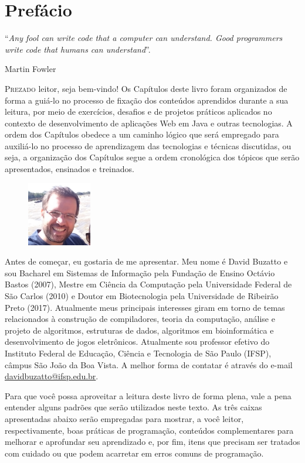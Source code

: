 \chapter{Prefácio}
\epigraph{``\textit{Any fool can write code that a computer can understand. Good programmers write code that humans can understand}''.}{Martin Fowler}

\lettrine[lines=4, lhang=0.1, lraise=0, loversize=0.2, findent=0.1em]{\textcolor{corAzulTema}{P}}{rezado} leitor, seja bem-vindo! Os Capítulos deste livro foram organizados de forma a guiá-lo no processo de fixação dos conteúdos aprendidos durante a sua leitura, por meio de exercícios, desafios e de projetos práticos aplicados no contexto de desenvolvimento de aplicações Web em Java e outras tecnologias. A ordem dos Capítulos obedece a um caminho lógico que será empregado para auxiliá-lo no processo de aprendizagem das tecnologias e técnicas discutidas, ou seja, a organização dos Capítulos segue a ordem cronológica dos tópicos que serão apresentados, ensinados e treinados.

\begin{figure}
    \centering
    \includegraphics[width=0.25\textwidth]{imagens/david}
\end{figure}

Antes de começar, eu gostaria de me apresentar. Meu nome é David Buzatto e sou Bacharel em Sistemas de Informação pela Fundação de Ensino Octávio Bastos (2007), Mestre em Ciência da Computação pela Universidade Federal de São Carlos (2010) e Doutor em Biotecnologia pela Universidade de Ribeirão Preto (2017). Atualmente meus principais interesses giram em torno de temas relacionados à construção de compiladores, teoria da computação, análise e projeto de algoritmos, estruturas de dados, algoritmos em bioinformática e desenvolvimento de jogos eletrônicos. Atualmente sou professor efetivo do Instituto Federal de Educação, Ciência e Tecnologia de São Paulo (IFSP), câmpus São João da Boa Vista. A melhor forma de contatar é através do e-mail \textcolor{corAzulTema}{\href{mailto:davidbuzatto@ifsp.edu.br}{davidbuzatto@ifsp.edu.br}}.

Para que você possa aproveitar a leitura deste livro de forma plena, vale a pena entender alguns padrões que serão utilizados neste texto. As três caixas apresentadas abaixo serão empregadas para mostrar, a você leitor, respectivamente, boas práticas de programação, conteúdos complementares para melhorar e aprofundar seu aprendizado e, por fim, itens que precisam ser tratados com cuidado ou que podem acarretar em erros comuns de programação.

